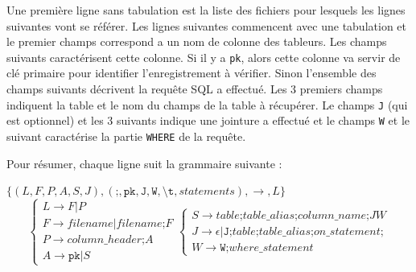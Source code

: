 \documentclass[12pt]{article}
\begin{document}
        Une première ligne sans tabulation est la liste des fichiers pour lesquels les lignes suivantes vont se référer.
        Les lignes suivantes commencent avec une tabulation et le premier champs correspond a un nom de colonne des tableurs. Les champs suivants caractérisent cette colonne.
        Si il y a \verb|pk|, alors cette colonne va servir de clé primaire pour identifier l'enregistrement à vérifier. 
        Sinon l'ensemble des champs suivants décrivent la requête \textsf{SQL} a effectué.
        Les 3 premiers champs indiquent la table et le nom du champs de la table à récupérer.
        Le champs \verb|J| (qui est optionnel) et les 3 suivants indique une jointure a effectué et le champs \verb|W| et le suivant caractérise la partie \verb|WHERE| de la requête.
        
        Pour résumer, chaque ligne suit la grammaire suivante : 
        
        \begin{center}
        $\{(L,F,P,A,S,J),(\texttt{;},\texttt{pk},\texttt{J},\texttt{W},\texttt{\textbackslash t},statements),\rightarrow,L\}$
        \begin{equation*}
            \begin{cases}L\rightarrow F|P
            \\F\rightarrow filename|filename\texttt{;}F
            \\P\rightarrow column\_header\texttt{;}A
            \\A\rightarrow \texttt{pk}|S\end{cases}
            \begin{cases}S\rightarrow table\texttt{;}table\_alias\texttt{;}column\_name\texttt{;}JW
            \\J\rightarrow \epsilon|\texttt{J}\texttt{;}table\texttt{;}table\_alias\texttt{;}on\_statement\texttt{;}
            \\W\rightarrow \texttt{W}\texttt{;}where\_statement\end{cases}
        \end{equation*}
        \end{center}
        
\end{document}
